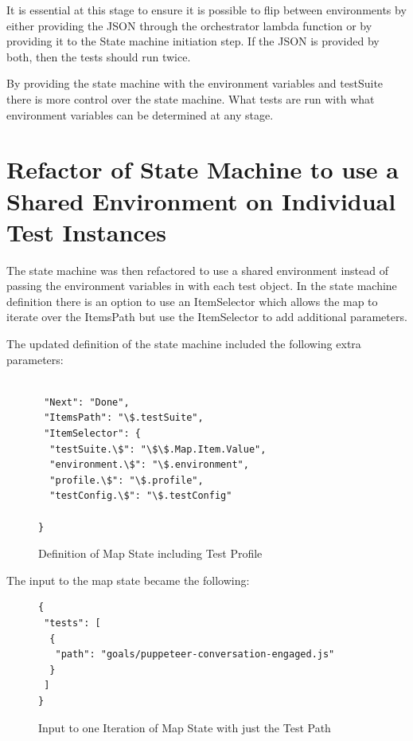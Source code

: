\documentclass[12pt,a4paper,titlepage]{report}
\begin{document}
It is essential at this stage to ensure it is possible to flip between environments by either providing the JSON through the
orchestrator lambda function or by providing it to the State machine initiation step. If the JSON is provided by both, then the tests should run twice.

By providing the state machine with the environment variables and testSuite there is more control over the state
machine. What tests are run with what environment variables can be determined at any stage.

\section{Refactor of State Machine to use a Shared Environment on Individual Test Instances }

The state machine was then refactored to use a shared environment instead of
passing the environment variables in with each test object. In the state machine definition there is an option to
use an ItemSelector which allows the map to iterate over the ItemsPath but use the ItemSelector to add additional
parameters.

The updated definition of the state machine included the following extra parameters:

\begin{figure}[H]
 \begin{tcolorbox}
  \begin{verbatim}

 "Next": "Done",
 "ItemsPath": "\$.testSuite",
 "ItemSelector": {
  "testSuite.\$": "\$\$.Map.Item.Value",
  "environment.\$": "\$.environment",
  "profile.\$": "\$.profile",
  "testConfig.\$": "\$.testConfig"

}
\end{verbatim}
 \end{tcolorbox}
 \caption{Definition of Map State including Test Profile}
\end{figure}

The input to the map state became the following:

\begin{figure}[H]
 \begin{tcolorbox}
  \begin{verbatim}
{
 "tests": [
  {
   "path": "goals/puppeteer-conversation-engaged.js"
  }
 ]
}
\end{verbatim}
 \end{tcolorbox}
 \caption{Input to one Iteration of Map State with just the Test Path}
\end{figure}
\end{document}
